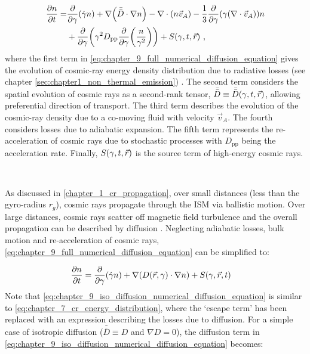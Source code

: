 \begin{equation}
    \begin{aligned}
        \pdv{n}{t}=&\pdv{ }{\gamma}\qty(\dot{\gamma}n)+\nabla\qty(\bar{\bar{D}}\cdot\nabla n)-\nabla\cdot\qty(n\vec{v}_A)-\frac{1}{3}\pdv{ }{\gamma}\qty(\gamma\qty(\nabla\cdot\vec{v}_A))n \\
        &+\pdv{ }{\gamma}\qty(\gamma^2 D_\mathrm{pp}\pdv{ }{\gamma}\qty(\frac{n}{\gamma^2})) + S\qty(\gamma,t,\vec{r})  \text{ ,}     
    \end{aligned} \label{eq:chapter_9_full_numerical_diffusion_equation}
\end{equation} 
\noindent where the first term in \autoref{eq:chapter_9_full_numerical_diffusion_equation} gives the evolution of cosmic-ray energy density distribution due to radiative losses (see chapter \autoref{sec:chapter1_non_thermal_emission}) . The second term considers the spatial evolution of cosmic rays as a second-rank tensor, $\bar{\bar{D}}\equiv\bar{\bar{D}}\qty(\gamma,t,\vec{r})$, allowing preferential direction of transport. The third term describes the evolution of the cosmic-ray density due to a co-moving fluid with velocity $\vec{v}_A$. The fourth considers losses due to adiabatic expansion. The fifth term represents the re-acceleration of cosmic rays due to stochastic processes with $D_\mathrm{pp}$ being the acceleration rate. Finally, $S\qty(\gamma,t,\vec{r})$ is the source term of high-energy cosmic rays.
\par~\par
As discussed in \autoref{chapter_1_cr_propagation}, over small distances (less than the gyro-radius $r_g$), cosmic rays propagate through the ISM via ballistic motion. Over large distances, cosmic rays scatter off magnetic field turbulence and the overall propagation can be described by diffusion \citep{2015PhRvD..92h3003P}. Neglecting adiabatic losses, bulk motion and re-acceleration of cosmic rays, \autoref{eq:chapter_9_full_numerical_diffusion_equation} can be simplified to:


\begin{equation}
\begin{aligned}
\pdv{n}{t}&=\pdv{ }{\gamma}\qty(\dot{\gamma}n) + \nabla\qty(D\qty(\vec{r},\gamma)\cdot \nabla n) + S\qty(\gamma,\vec{r},t)
\end{aligned} \label{eq:chapter_9_iso_diffusion_numerical_diffusion_equation}
\end{equation} 
\noindent Note that \autoref{eq:chapter_9_iso_diffusion_numerical_diffusion_equation} is similar to \autoref{eq:chapter_7_cr_energy_distribution}, where the `escape term' has been replaced with an expression describing the losses due to diffusion. For a simple case of isotropic diffusion ($\bar{\bar{D}}\equiv D$ and $\nabla D=0$), the diffusion term in \autoref{eq:chapter_9_iso_diffusion_numerical_diffusion_equation} becomes: 

